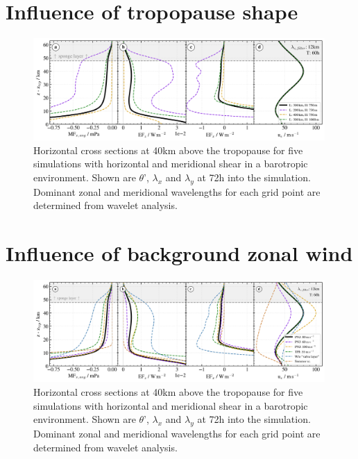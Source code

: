 \section{Influence of tropopause shape}
\begin{figure}[tbp]
    \centering
    \includegraphics[width=0.99\textwidth]{figures_q3D/TD-zprofiles-translbq3D_shape-T60h-avg.png}
    \caption{Horizontal cross sections at 40km above the tropopause for five simulations with horizontal and meridional shear in a barotropic environment. Shown are $\theta$', $\lambda_x$ and $\lambda_y$ at 72h into the simulation. Dominant zonal and meridional wavelengths for each grid point are determined from wavelet analysis.}
    \label{fig:q3D_shape}
\end{figure}


\section{Influence of background zonal wind}
\label{sec:q3D-wind}
\begin{figure}[tbp]
    \centering
    \includegraphics[width=0.99\textwidth]{figures_q3D/TD-zprofiles-translbq3D_wind-T60h-avg.png}
    \caption{Horizontal cross sections at 40km above the tropopause for five simulations with horizontal and meridional shear in a barotropic environment. Shown are $\theta$', $\lambda_x$ and $\lambda_y$ at 72h into the simulation. Dominant zonal and meridional wavelengths for each grid point are determined from wavelet analysis.}
    \label{fig:q3D-wind}
\end{figure}

